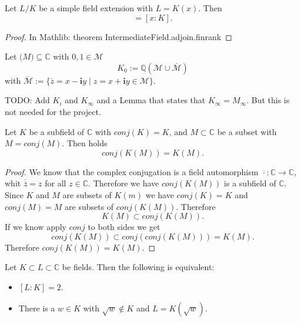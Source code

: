 \begin{theorem}
    Let $L/K$ be a simple field extension with $L = K(x)$. Then
    \begin{equation*}
        [L:K] = [x:K].
    \end{equation*}
\end{theorem}
\begin{proof}
    In Mathlib: theorem IntermediateField.adjoin.finrank
\end{proof}

\begin{definition}
    Let $\mathcal(M)\subseteq\mathbb{C}$ with $0,1 \in \mathcal{M}$
    \begin{equation*}
        K_0 := \mathbb{Q}(\mathcal{M}\cup \overline{\mathcal{M}})
    \end{equation*}
    with $\overline{\mathcal{M}} := \{ \overline{z} = x - \textbf{i}y \mid z = x+\textbf{i}y  \in \mathcal{M} \}$.
\end{definition}

TODO: Add $K_i$ and $K_{\infty}$ and a Lemma that states that $K_{\infty} = M_{\infty}$. But this is not needed for the project.

\begin{lemma}
    Let $K$ be a subfield of $\mathbb{C}$ with $conj(K)=K$, and $ M \subset \mathbb{C}$ be a subset with $M = conj(M)$. Then holds
    \begin{equation*}
        conj(K(M)) = K(M).
    \end{equation*}
\end{lemma}
\begin{proof}
    We know that the complex conjugation is a field automorphism $\overline{\cdot }: \mathbb{C} \to \mathbb{C}$, whit $\overline{\overline{z}} = z$ for all $z \in \mathbb{C}$. Therefore we have
    $conj(K(M))$ is a subfield of $\mathbb{C}$.\\
    Since $K$ and $M$ are subsets of $K(m)$ we have $conj(K) = K$ and $conj(M) = M$ are subsets of $conj(K(M))$. Therefore $$K(M) \subset conj(K(M)).$$
    If we know apply $conj$ to both sides we get
    $$conj(K(M)) \subset conj(conj(K(M))) = K(M).$$
    Therefore $conj(K(M)) = K(M)$.
\end{proof}

\begin{lemma}
    Let $K\subset L \subset \mathbb{C}$ be fields. Then the following is equivalent:
    \begin{itemize}
        \item $[L:K] = 2$.
        \item There is a $w \in K$ with $\sqrt{w} \notin K$ and $L = K(\sqrt{w})$.
    \end{itemize}
\end{lemma}


